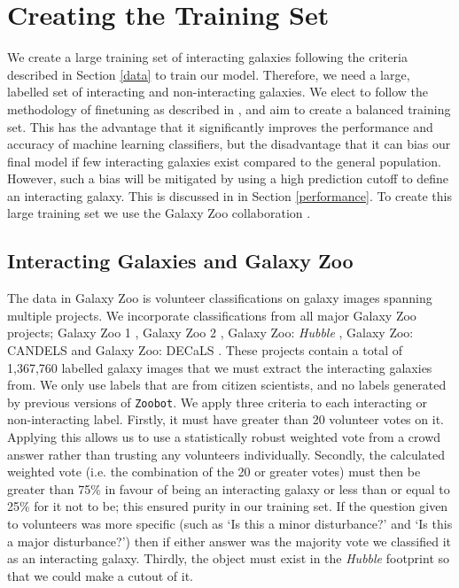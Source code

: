 \section{Creating the Training Set}\label{training}
\noindent We create a large training set of interacting galaxies following the criteria described in Section \ref{data} to train our model. Therefore, we need a large, labelled set of interacting and non-interacting galaxies. We elect to follow the methodology of finetuning as described in \citet{2022MNRAS.513.1581W}, and aim to create a balanced training set. This has the advantage that it significantly improves the performance and accuracy of machine learning classifiers, but the disadvantage that it can bias our final model if few interacting galaxies exist compared to the general population. However, such a bias will be mitigated by using a high prediction cutoff to define an interacting galaxy. This is discussed in in Section \ref{performance}. To create this large training set we use the Galaxy Zoo collaboration \citep[initial data release described in][]{2008MNRAS.389.1179L}.

\subsection{Interacting Galaxies and Galaxy Zoo}
\noindent The data in Galaxy Zoo is volunteer classifications on galaxy images spanning multiple projects. We incorporate classifications from all major Galaxy Zoo projects; Galaxy Zoo 1 \citep{2008MNRAS.389.1179L}, Galaxy Zoo 2 \citep{2013MNRAS.435.2835W}, Galaxy Zoo: \emph{Hubble} \citep{2017MNRAS.464.4176W}, Galaxy Zoo: CANDELS \citep{2017MNRAS.464.4420S} and Galaxy Zoo: DECaLS \citep{2022MNRAS.509.3966W}. These projects contain a total of 1,367,760 labelled galaxy images that we must extract the interacting galaxies from. We only use labels that are from citizen scientists, and no labels generated by previous versions of \texttt{Zoobot}. We apply three criteria to each interacting or non-interacting label. Firstly, it must have greater than 20 volunteer votes on it. Applying this allows us to use a statistically robust weighted vote from a crowd answer rather than trusting any volunteers individually. Secondly, the calculated weighted vote (i.e. the combination of the 20 or greater votes) must then be greater than 75\% in favour of being an interacting galaxy or less than or equal to 25\% for it not to be; this ensured purity in our training set. If the question given to volunteers was more specific (such as `Is this a minor disturbance?' and `Is this a major disturbance?') then if either answer was the majority vote we classified it as an interacting galaxy. Thirdly, the object must exist in the \emph{Hubble} footprint so that we could make a cutout of it.

